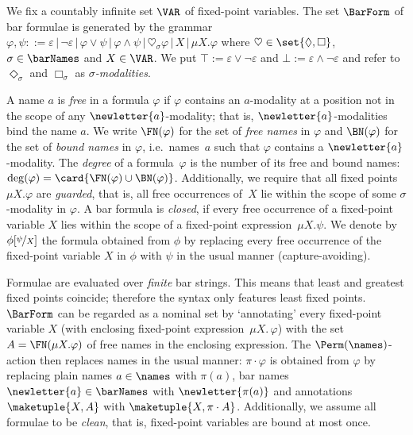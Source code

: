 \documentclass[10pt, final, conference, a4paper, twocolumn]{IEEEtran}
\renewcommand{\enquote}[1]{`#1'}
\begin{document}
\begin{defn}%
  We fix a countably infinite set $\VAR$ of fixed-point variables. The set $\BarForm$ of bar formulae
  is generated by the grammar $\varphi, \psi ::= \varepsilon\,\vert\,\neg\varepsilon\,\vert\,\varphi\vee\psi
  \,\vert\,\varphi\wedge\psi\,\vert\,\heartsuit_\sigma \varphi\,\vert\,X\,\vert\,\mu X.\varphi$ where
  $\heartsuit \in \set{\Diamond, \Box}$, $\sigma \in \barNames$ and $X \in \VAR$. We put
  $\top := \varepsilon \vee \neg\varepsilon$ and $\bot := \varepsilon \wedge \neg\varepsilon$ and
  refer to $\Diamond_\sigma$ and $\Box_\sigma$ as \emph{$\sigma$-modalities}.

  A name $a$ is \emph{free} in a formula $\varphi$ if $\varphi$ contains an $a$-modality at a position
  not in the scope of any $\newletter{a}$-modality; that is, $\newletter{a}$-modalities bind the name $a$.
  We write $\FN(\varphi)$ for the set of \emph{free names} in $\varphi$ and $\BN(\varphi)$ for
  the set of \emph{bound names} in $\varphi$, i.e.~names~$a$ such that $\varphi$ contains a $\newletter{a}$-modality.
  The \emph{degree} of a formula~$\varphi$ is the number of its free and bound names: $\deg(\varphi) = \card{\FN(\varphi) \cup \BN(\varphi)}$.
  Additionally, we require that all fixed points $\mu X. \varphi$ are \emph{guarded}, that is, all free occurrences of~$X$ lie within the scope of some $\sigma$-modality in $\varphi$.
  A bar formula is \emph{closed}, if every free occurrence of a fixed-point variable $X$ lies within the
  scope of a fixed-point expression~$\mu X. \psi$. We denote by $\phi[\nicefrac{\psi}{X}]$ the
  formula obtained from $\phi$ by replacing every free occurrence of the fixed-point variable $X$ in $\phi$ with $\psi$
  in the usual manner (capture-avoiding).
\end{defn}

Formulae are evaluated over \emph{finite} bar strings. This means that least and greatest fixed points coincide; therefore the syntax only features least fixed points.
$\BarForm$ can be regarded as a nominal set by \enquote{annotating} every fixed-point variable $X$
(with enclosing fixed-point expression~$\mu X.\, \varphi$) with the set $A = \FN(\mu X. \varphi)$ of free names
in the enclosing expression. The $\Perm(\names)$-action then replaces names in the usual manner:
$\pi \cdot \varphi$ is obtained from $\varphi$ by replacing plain names $a \in \names$ with
$\pi(a)$, bar names $\newletter{a} \in \barNames$ with $\newletter{\pi(a)}$ and annotations
$\maketuple{X, A}$ with $\maketuple{X, \pi \cdot A}$. Additionally, we assume all formulae
to be \emph{clean}, that is, fixed-point variables are bound at most once.
\end{document}
